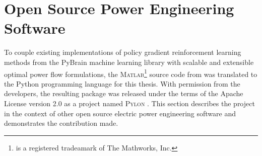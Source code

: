 
\newpage
\section{Open Source Power Engineering Software}
\label{sec:oss}
To couple existing implementations of policy gradient reinforcement
learning methods from the PyBrain machine learning library with scalable and
extensible optimal power flow formulations, the
\textsc{Matlab}\footnote{\matlab is a registered tradeamark of The Mathworks,
Inc.} source code from \matpower was translated to the Python programming
language for this thesis. With permission from the \matpower developers, the
resulting package was released under the terms of the Apache License version
2.0 as a project named \textsc{Pylon} \cite{lincoln:pyreto}.   This section describes the project in the context of other open source electric
power engineering software and demonstrates the contribution made.

